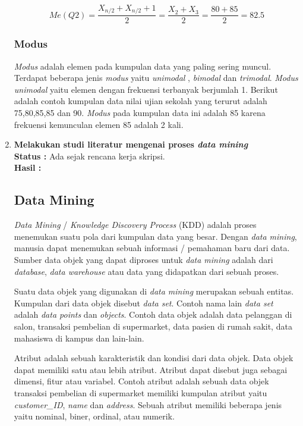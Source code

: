 \documentclass[a4paper,twoside]{article}
\begin{document}
\begin{enumerate}
\begin{displaymath}
Me(Q2) = \frac{X_{n/2} + X_{n/2}+1}{2} = \frac{X_{2} + X_{3}}{2} = \frac{80+85}{2} = 82.5
\end{displaymath}

\subsubsection{Modus}
\textit{Modus} adalah elemen pada kumpulan data yang paling sering muncul. Terdapat beberapa jenis \textit{modus} yaitu \textit{unimodal} , \textit{bimodal} dan \textit{trimodal}.  \textit{Modus unimodal} yaitu elemen dengan frekuensi terbanyak berjumlah 1. Berikut adalah contoh kumpulan data nilai ujian sekolah yang terurut adalah 75,80,85,85 dan 90. \textit{Modus} pada kumpulan data ini adalah 85 karena frekuensi kemunculan elemen 85 adalah 2 kali.  

\item \textbf{Melakukan studi literatur mengenai proses \textit{data mining} }\\
		{\bf Status :} Ada sejak rencana kerja skripsi.\\
		{\bf Hasil : }
\subsection{Data Mining}
\textit{Data Mining} / \textit{Knowledge Discovery Process} (KDD) adalah proses menemukan suatu pola dari kumpulan data yang besar. Dengan \textit{data mining}, manusia dapat menemukan sebuah 
informasi / pemahaman baru dari data. Sumber data objek yang dapat diproses untuk \textit{data mining} adalah dari \textit{database}, \textit{data warehouse} atau data yang didapatkan dari sebuah proses.

Suatu data objek yang digunakan di \textit{data mining} merupakan sebuah entitas. Kumpulan dari data objek disebut \textit{data set}. Contoh nama lain \textit{data set} adalah \textit{data points} dan \textit{objects}. Contoh data objek adalah data pelanggan di salon, transaksi pembelian di supermarket, data pasien di rumah sakit, data mahasiswa di kampus dan lain-lain.

Atribut adalah sebuah karakteristik dan kondisi dari data objek. Data objek dapat memiliki satu atau lebih atribut.  Atribut dapat disebut juga sebagai dimensi, fitur atau variabel. Contoh atribut adalah
sebuah data objek transaksi pembelian di supermarket memiliki kumpulan atribut yaitu \textit{customer\_ID}, \textit{name} dan \textit{address}. Sebuah atribut memiliki beberapa jenis yaitu nominal, biner, ordinal, atau numerik. 


\end{enumerate}
\end{document}
